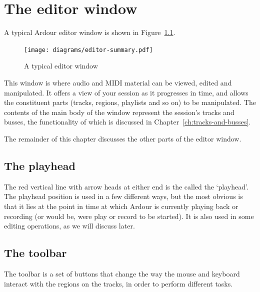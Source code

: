 \documentclass[10pt,a4paper]{book}
\begin{document}
{%

\chapter{The editor window}
\label{ch:editor-window}

A typical Ardour editor window is shown in Figure~\ref{fig:typical-editor2}.

\begin{figure}[ht]
\begin{center}
\texttt{[image: diagrams/editor-summary.pdf]}
\end{center}
\caption{A typical editor window}
\label{fig:typical-editor2}
\end{figure}

This window is where audio and MIDI material can be viewed, edited and
manipulated.  It offers a view of your session as it progresses in
time, and allows the constituent parts (tracks, regions, playlists and
so on) to be manipulated.  The contents of the main body of the window
represent the session's tracks and busses, the functionality of which
is discussed in Chapter~\ref{ch:tracks-and-busses}.

The remainder of this chapter discusses the other parts of the editor window.


\section{The playhead}

The red vertical line with arrow heads at either end is the called the
`playhead'.  The playhead position is used in a few different ways,
but the most obvious is that it lies at the point in time at which
Ardour is currently playing back or recording (or would be, were play
or record to be started).  It is also used in some editing operations,
as we will discuss later.


\section{The toolbar}

The toolbar is a set of buttons that change the way the mouse and
keyboard interact with the regions on the tracks, in order to perform
different tasks.

}
\end{document}
